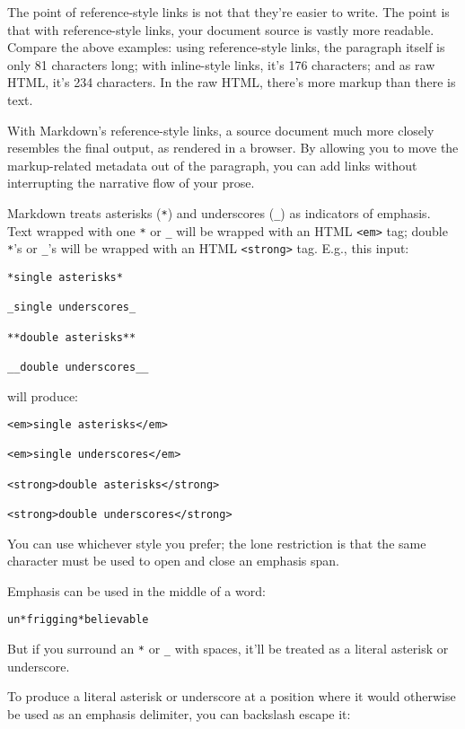 The point of reference-style links is not that they're easier to
write. The point is that with reference-style links, your document
source is vastly more readable. Compare the above examples: using
reference-style links, the paragraph itself is only 81 characters
long; with inline-style links, it's 176 characters; and as raw HTML,
it's 234 characters. In the raw HTML, there's more markup than there
is text.

With Markdown's reference-style links, a source document much more
closely resembles the final output, as rendered in a browser. By
allowing you to move the markup-related metadata out of the paragraph,
you can add links without interrupting the narrative flow of your
prose.

Markdown treats asterisks (\texttt{*}) and underscores (\texttt{\_}) as indicators of
emphasis. Text wrapped with one \texttt{*} or \texttt{\_} will be wrapped with an
HTML \texttt{<em>} tag; double \texttt{*}'s or \texttt{\_}'s will be wrapped with an HTML
\texttt{<strong>} tag. E.g., this input:

\begin{verbatim}
*single asterisks*

_single underscores_

**double asterisks**

__double underscores__
\end{verbatim}

will produce:

\begin{verbatim}
<em>single asterisks</em>

<em>single underscores</em>

<strong>double asterisks</strong>

<strong>double underscores</strong>
\end{verbatim}

You can use whichever style you prefer; the lone restriction is that
the same character must be used to open and close an emphasis span.

Emphasis can be used in the middle of a word:

\begin{verbatim}
un*frigging*believable
\end{verbatim}

But if you surround an \texttt{*} or \texttt{\_} with spaces, it'll be treated as a
literal asterisk or underscore.

To produce a literal asterisk or underscore at a position where it
would otherwise be used as an emphasis delimiter, you can backslash
escape it:

